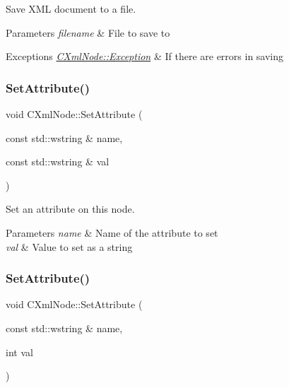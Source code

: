Save X\+ML document to a file. 


\begin{DoxyParams}{Parameters}
{\em filename} & File to save to \\
\hline
\end{DoxyParams}

\begin{DoxyExceptions}{Exceptions}
{\em \mbox{\hyperlink{classxmlnode_1_1_c_xml_node_1_1_exception}{C\+Xml\+Node\+::\+Exception}}} & If there are errors in saving \\
\hline
\end{DoxyExceptions}
\mbox{\label{classxmlnode_1_1_c_xml_node_ac2543c8908d29642f70c9ce437475bf1}} 
\subsubsection{\texorpdfstring{SetAttribute()}{SetAttribute()}\hspace{0.1cm}{\footnotesize\ttfamily [1/3]}}
{\footnotesize\ttfamily void C\+Xml\+Node\+::\+Set\+Attribute (\begin{DoxyParamCaption}\item[{const std\+::wstring \&}]{name,  }\item[{const std\+::wstring \&}]{val }\end{DoxyParamCaption})}



Set an attribute on this node. 


\begin{DoxyParams}{Parameters}
{\em name} & Name of the attribute to set \\
\hline
{\em val} & Value to set as a string \\
\hline
\end{DoxyParams}
\mbox{\label{classxmlnode_1_1_c_xml_node_a6771d1de541ffefcf8a4fcd809b12b62}} 
\subsubsection{\texorpdfstring{SetAttribute()}{SetAttribute()}\hspace{0.1cm}{\footnotesize\ttfamily [2/3]}}
{\footnotesize\ttfamily void C\+Xml\+Node\+::\+Set\+Attribute (\begin{DoxyParamCaption}\item[{const std\+::wstring \&}]{name,  }\item[{int}]{val }\end{DoxyParamCaption})}




